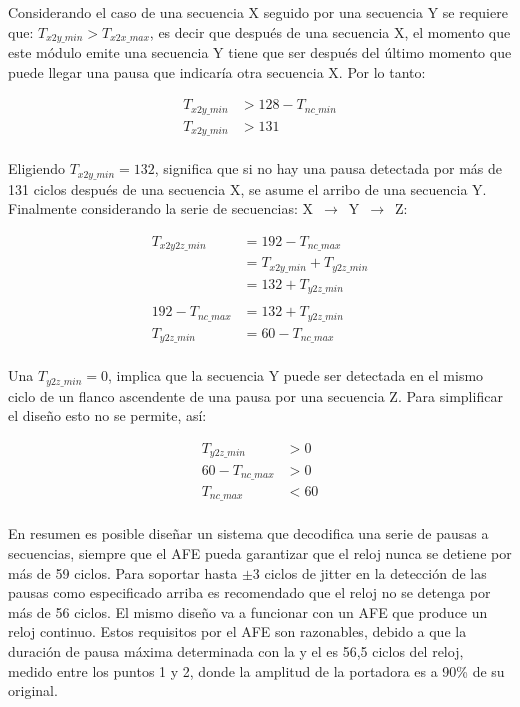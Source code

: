 \documentclass[a4paper, twoside, 11pt]{report}
\begin{document}
Considerando el caso de una secuencia X seguido por una secuencia Y se requiere que: $T_{x2y\_min} > T_{x2x\_max}$, es decir que después de una secuencia X, el momento que este módulo emite una secuencia Y tiene que ser después del último momento que puede llegar una pausa que indicaría otra secuencia X. Por lo tanto:

\begin{align*}
    T_{x2y\_min} &> 128 - T_{nc\_min} \\
    T_{x2y\_min} &> 131 \\
\end{align*}

Eligiendo $T_{x2y\_min} = 132$, significa que si no hay una pausa detectada por más de 131 ciclos después de una secuencia X, se asume el arribo de una secuencia Y. Finalmente considerando la serie de secuencias: X~$\rightarrow$~Y~$\rightarrow$~Z:

\begin{align*}
    T_{x2y2z\_min} &= 192 - T_{nc\_max} \\
               &= T_{x2y\_min} + T_{y2z\_min} \\
               &= 132 + T_{y2z\_min} \\
    \\
    192 - T_{nc\_max} &= 132 + T_{y2z\_min} \\
    T_{y2z\_min} &= 60 - T_{nc\_max} \\
\end{align*}

Una $T_{y2z\_min} = 0$, implica que la secuencia Y puede ser detectada en el mismo ciclo de un flanco ascendente de una pausa por una secuencia Z. Para simplificar el diseño esto no se permite, así:

\begin{align*}
    T_{y2z\_min} &> 0 \\
    60 - T_{nc\_max} &> 0 \\
    T_{nc\_max} &< 60 \\
\end{align*}

En resumen es posible diseñar un sistema que decodifica una serie de pausas a secuencias, siempre que el AFE pueda garantizar que el reloj nunca se detiene por más de 59 ciclos. Para soportar hasta $\pm 3$ ciclos de jitter en la detección de las pausas como especificado arriba es recomendado que el reloj no se detenga por más de 56 ciclos. El mismo diseño va a funcionar con un AFE que produce un reloj continuo. Estos requisitos por el AFE son razonables, debido a que la duración de pausa máxima determinada con la  y el  es 56,5 ciclos del reloj, medido entre los puntos 1 y 2, donde la amplitud de la portadora es a 90\% de su original.
\end{document}
